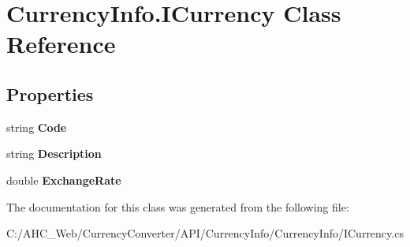 \hypertarget{class_currency_info_1_1_i_currency}{\section{Currency\-Info.\-I\-Currency Class Reference}
\label{class_currency_info_1_1_i_currency}
}
\subsection*{Properties}
\begin{DoxyCompactItemize}
\item 
\hypertarget{class_currency_info_1_1_i_currency_a67484d508091baef5ca022b6cad1e79c}{string {\bfseries Code}}\label{class_currency_info_1_1_i_currency_a67484d508091baef5ca022b6cad1e79c}

\item 
\hypertarget{class_currency_info_1_1_i_currency_a78dbac79add72a8854c703baadd3c2cf}{string {\bfseries Description}}\label{class_currency_info_1_1_i_currency_a78dbac79add72a8854c703baadd3c2cf}

\item 
\hypertarget{class_currency_info_1_1_i_currency_a134d234d87c7eb9fbe7c2d2e59183e3c}{double {\bfseries Exchange\-Rate}}\label{class_currency_info_1_1_i_currency_a134d234d87c7eb9fbe7c2d2e59183e3c}

\end{DoxyCompactItemize}


The documentation for this class was generated from the following file\-:\begin{DoxyCompactItemize}
\item 
C\-:/\-A\-H\-C\-\_\-\-Web/\-Currency\-Converter/\-A\-P\-I/\-Currency\-Info/\-Currency\-Info/I\-Currency.\-cs\end{DoxyCompactItemize}
